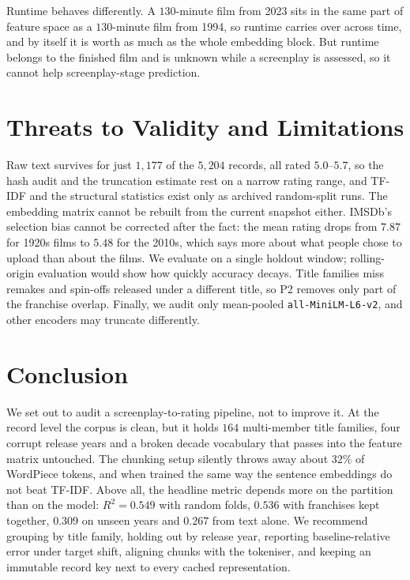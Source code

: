 \documentclass[conference,a4paper]{IEEEtran}
\begin{document}
Runtime behaves differently. A $130$-minute film from 2023 sits in the
same part of feature space as a $130$-minute film from 1994, so runtime
carries over across time, and by itself it is worth as much as the whole
embedding block. But runtime belongs to the finished film and is unknown
while a screenplay is assessed, so it cannot help screenplay-stage
prediction.

\section{Threats to Validity and Limitations}
\label{sec:limits}

Raw text survives for just $1{,}177$ of the $5{,}204$ records, all rated
$5.0$--$5.7$, so the hash audit and the truncation estimate rest on a
narrow rating range, and TF-IDF and the structural statistics exist only
as archived random-split runs. The
embedding matrix cannot be rebuilt from the current snapshot either.
IMSDb's selection bias cannot be corrected after the fact: the mean
rating drops from $7.87$ for 1920s films to $5.48$ for the 2010s, which
says more about what people chose to upload than about the films. We
evaluate on a single holdout window; rolling-origin evaluation would show
how quickly accuracy decays. Title families miss remakes and spin-offs
released under a different title, so P2 removes only part of the
franchise overlap. Finally, we audit only mean-pooled
\texttt{all-MiniLM-L6-v2}, and other encoders may truncate differently.

\section{Conclusion}

We set out to audit a screenplay-to-rating pipeline, not to improve it.
At the record level the corpus is clean, but it holds $164$
multi-member title families, four corrupt release years and a broken
decade vocabulary that passes into the feature matrix untouched. The
chunking setup silently throws away about $32\%$ of WordPiece tokens, and
when trained the same way the sentence embeddings do not beat TF-IDF.
Above all, the headline metric depends more on the partition than on the
model: $R^{2} = 0.549$ with random folds, $0.536$ with franchises kept
together, $0.309$ on unseen years and $0.267$ from text alone. We
recommend grouping by title family, holding out by release year,
reporting baseline-relative error under target shift, aligning chunks
with the tokeniser, and keeping an immutable record key next to every
cached representation.
\end{document}
